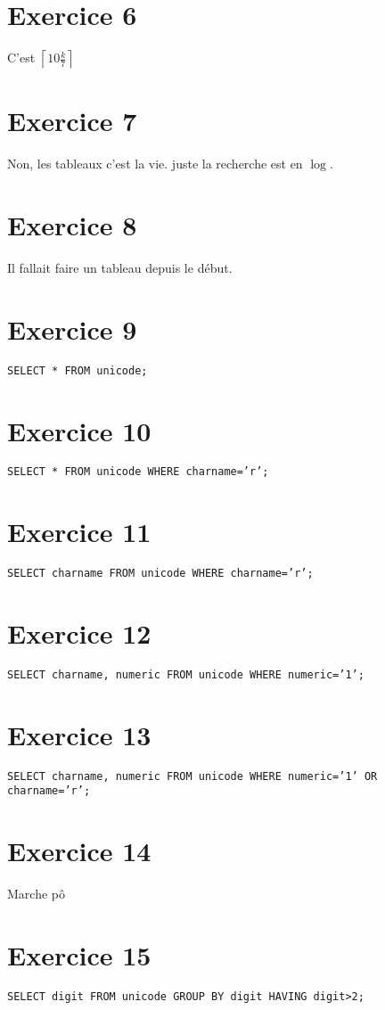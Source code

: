 \documentclass{cours}
\begin{document}
\section{Exercice 6}
C'est $\left\lceil 10\frac{k}{7}\right\rceil$

\section{Exercice 7}
Non, les tableaux c'est la vie. juste la recherche est en $\log$.

\section{Exercice 8}
Il fallait faire un tableau depuis le début. 

\section{Exercice 9}
\tt SELECT * FROM unicode;

\section{Exercice 10}
\tt SELECT * FROM unicode WHERE charname='r';

\section{Exercice 11}
\tt SELECT charname FROM unicode WHERE charname='r';

\section{Exercice 12}
\tt SELECT charname, numeric FROM unicode WHERE numeric='1';

\section{Exercice 13}
\tt SELECT charname, numeric FROM unicode WHERE numeric='1' OR charname='r';

\section{Exercice 14}
Marche pô

\section{Exercice 15}
\tt SELECT digit FROM unicode GROUP BY digit HAVING digit>2;
\end{document}
